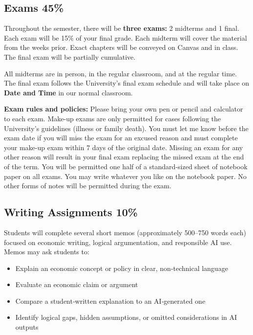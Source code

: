 \documentclass[
]{book}
\providecommand{\tightlist}{%
  \setlength{\itemsep}{0pt}\setlength{\parskip}{0pt}}
\begin{document}
\subsection*{Exams 45\%}\label{exams-45}

Throughout the semester, there will be \textbf{three exams:} 2 midterms and 1 final. Each exam will be 15\% of your final grade. Each midterm will cover the material from the weeks prior. Exact chapters will be conveyed on Canvas and in class. The final exam will be partially cumulative.

All midterms are in person, in the regular classroom, and at the regular time. The final exam follows the University's final exam schedule and will take place on \textbf{Date and Time} in our normal classroom.

\textbf{Exam rules and policies:} Please bring your own pen or pencil and calculator to each exam. Make-up exams are only permitted for cases following the University's guidelines (illness or family death). You must let me know before the exam date if you will miss the exam for an excused reason and must complete your make-up exam within 7 days of the original date. Missing an exam for any other reason will result in your final exam replacing the missed exam at the end of the term. You will be permitted one half of a standard-sized sheet of notebook paper on all exams. You may write whatever you like on the notebook paper. No other forms of notes will be permitted during the exam.

\subsection*{Writing Assignments 10\%}\label{writing-assignments-10}

Students will complete several short memos (approximately 500--750 words each) focused on economic writing, logical argumentation, and responsible AI use.
Memos may ask students to:

\begin{itemize}
\tightlist
\item
  Explain an economic concept or policy in clear, non‑technical language
\item
  Evaluate an economic claim or argument
\item
  Compare a student‑written explanation to an AI‑generated one
\item
  Identify logical gaps, hidden assumptions, or omitted considerations in AI outputs
\end{itemize}
\end{document}
